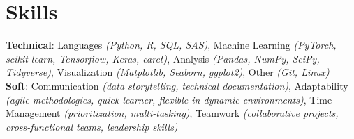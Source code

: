 \documentclass[letterpaper,11pt]{article}
\begin{document}
%
\section{Skills}
 \begin{itemize}[leftmargin=0.15in, label={}]
    \small{\item{
     \textbf{Technical}{: Languages \textit{(Python, R, SQL, SAS)}, Machine Learning \textit{(PyTorch, scikit-learn, Tensorflow, Keras, caret)}, Analysis \textit{(Pandas, NumPy, SciPy, Tidyverse)}, Visualization \textit{(Matplotlib, Seaborn, ggplot2)}, Other \textit{(Git, Linux)}} \\
     \textbf{Soft}{: Communication \textit{(data storytelling, technical documentation)}, Adaptability \textit{(agile methodologies, quick learner, flexible in dynamic environments)}, Time Management \textit{(prioritization, multi-tasking)}, Teamwork \textit{(collaborative projects, cross-functional teams, leadership skills)}}  \\
    }}
 \end{itemize}

% 
\end{document}
